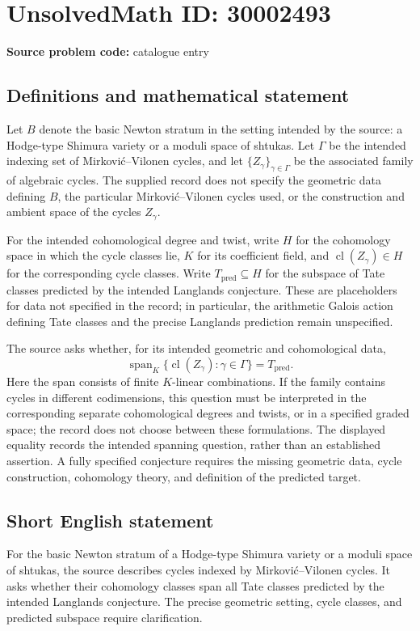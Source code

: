 \documentclass[11pt]{article}
\begin{document}
\section*{UnsolvedMath ID: 30002493}
\textbf{Source problem code:} catalogue entry
\subsection{Definitions and mathematical statement}
Let \(B\) denote the basic Newton stratum in the setting intended by the source: a Hodge-type Shimura variety or a moduli space of shtukas. Let \(\Gamma\) be the intended indexing set of Mirković–Vilonen cycles, and let \(\{Z_\gamma\}_{\gamma\in\Gamma}\) be the associated family of algebraic cycles. The supplied record does not specify the geometric data defining \(B\), the particular Mirković–Vilonen cycles used, or the construction and ambient space of the cycles \(Z_\gamma\).

For the intended cohomological degree and twist, write \(H\) for the cohomology space in which the cycle classes lie, \(K\) for its coefficient field, and \(\operatorname{cl}(Z_\gamma)\in H\) for the corresponding cycle classes. Write \(T_{\mathrm{pred}}\subseteq H\) for the subspace of Tate classes predicted by the intended Langlands conjecture. These are placeholders for data not specified in the record; in particular, the arithmetic Galois action defining Tate classes and the precise Langlands prediction remain unspecified.

The source asks whether, for its intended geometric and cohomological data,
\[
\operatorname{span}_{K}\{\operatorname{cl}(Z_\gamma):\gamma\in\Gamma\}
= T_{\mathrm{pred}}.
\]
Here the span consists of finite \(K\)-linear combinations. If the family contains cycles in different codimensions, this question must be interpreted in the corresponding separate cohomological degrees and twists, or in a specified graded space; the record does not choose between these formulations. The displayed equality records the intended spanning question, rather than an established assertion. A fully specified conjecture requires the missing geometric data, cycle construction, cohomology theory, and definition of the predicted target.
\subsection{Short English statement}
For the basic Newton stratum of a Hodge-type Shimura variety or a moduli space of shtukas, the source describes cycles indexed by Mirković–Vilonen cycles. It asks whether their cohomology classes span all Tate classes predicted by the intended Langlands conjecture. The precise geometric setting, cycle classes, and predicted subspace require clarification.
\end{document}
